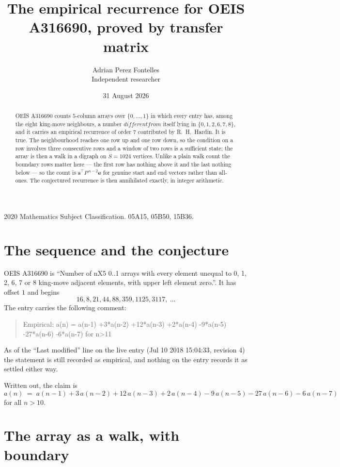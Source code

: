 \documentclass[11pt,a4paper]{article}
\title{The empirical recurrence for OEIS A316690, proved by transfer matrix}
\author{Adrian Perez Fontelles\\ \small Independent researcher}
\date{31 August 2026}
\theoremstyle{plain}
\theoremstyle{definition}
\begin{document}
\maketitle

\begin{abstract}
OEIS A316690 counts $5$-column arrays over $\{0,\dots,1\}$ in which every entry has,
among the eight king-move neighbours, a number $different from$ itself lying in $\{0,1,2,6,7,8\}$, and it carries an empirical
recurrence of order $7$ contributed by R.~H.~Hardin. It is true. The neighbourhood
reaches one row up and one row down, so the condition on a row involves three consecutive
rows and a window of two rows is a sufficient state; the array is then a walk in a digraph
on $S=1024$ vertices. Unlike a plain walk count the boundary rows matter here --- the first
row has nothing above it and the last nothing below --- so the count is
$\mathbf{s}^{\!\top}P^{\,n-2}\mathbf{e}$ for genuine start and end vectors rather than
all-ones. The conjectured recurrence is then annihilated exactly, in integer arithmetic.
\end{abstract}

\noindent\small 2020 Mathematics Subject Classification. 05A15, 05B50, 15B36.\normalsize

\section{The sequence and the conjecture}

OEIS A316690 is ``Number of nX5 0..1 arrays with every element unequal to 0, 1, 2, 6, 7 or 8 king-move adjacent elements, with upper left element zero.''. It has offset
$1$ and begins
\[
16, 8, 21, 44, 88, 359, 1125, 3117,\ \dots
\]
The entry carries the following comment:
\begin{quote}\small
Empirical: a(n) = a(n-1) +3*a(n-2) +12*a(n-3) +2*a(n-4) -9*a(n-5) -27*a(n-6) -6*a(n-7) for n>11
\end{quote}
As of the ``Last modified'' line on the live entry (Jul 10 2018 15:04:33, revision
4) the statement is still recorded as empirical, and nothing on the entry
records it as settled either way.

Written out, the claim is
\begin{equation}\label{eq:conj}
a(n)\;=\;a(n-1) + 3\,a(n-2) + 12\,a(n-3) + 2\,a(n-4) - 9\,a(n-5) - 27\,a(n-6) - 6\,a(n-7)
\end{equation}
for all $n>10$.

\section{The array as a walk, with boundary}
\end{document}

